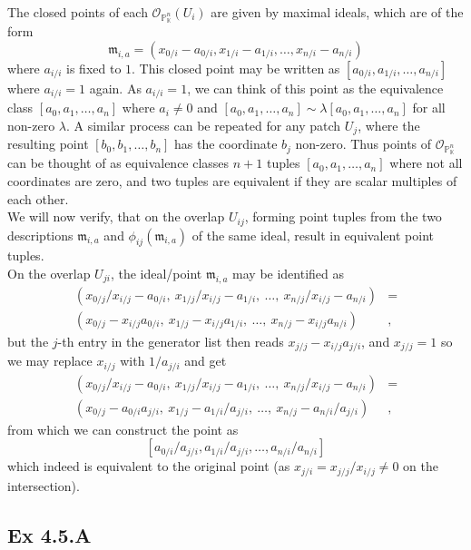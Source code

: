 \documentclass{article}
\theoremstyle{definition}
\newcommand{\K}{\mathbb{K}}
\renewcommand{\P}{\mathbb{P}}
\newcommand{\oo}{\mathcal{O}}
\newcommand{\oop}[2]{\oo_{\P^{#1}_{#2}}}
\begin{document}
The closed points of each $\oop{n}{\K}(U_i)$ are given by maximal ideals, which
are of the form
\[
	\mathfrak{m}_{i, a} = (x_{0/i} - a_{0/i}, x_{1/i} - a_{1/i}, \ldots, x_{n/i} -
	a_{n/i})
\]
where $a_{i/i}$ is fixed to $1$. This closed point may be written as $[a_{0/i},
			a_{1/i}, \ldots, a_{n/i}]$ where $a_{i/i} = 1$ again. As $a_{i/i} = 1$, we can
think of this point as the equivalence class $[a_{0}, a_{1}, \ldots, a_{n}]$
where $a_i \not = 0$ and $[a_{0}, a_{1}, \ldots, a_{n}] \sim \lambda[a_{0},
		a_{1}, \ldots, a_{n}]$ for all non-zero $\lambda$. A similar process can be
repeated for any patch $U_j$, where the resulting point $[b_{0}, b_{1}, \ldots,
			b_{n}]$ has the coordinate $b_j$ non-zero. Thus points of $\oop{n}{\K}$ can be
thought of as equivalence classes $n + 1$ tuples $[a_{0}, a_{1}, \ldots,
			a_{n}]$ where not all coordinates are zero, and two tuples are equivalent if
they are scalar multiples of each other. \\

We will now verify, that on the overlap $U_{ij}$, forming point tuples from the
two descriptions $\mathfrak{m}_{i, a}$ and $\phi_{ij}(\mathfrak{m}_{i, a})$ of
the same ideal, result in equivalent point tuples. \\

On the overlap $U_{ji}$, the ideal/point $\mathfrak{m}_{i, a}$ may be
identified as
\begin{align*}
	(x_{0/j}/x_{i/j} - a_{0/i},\ x_{1/j}/x_{i/j} - a_{1/i},\ \ldots,\ x_{n/j}/x_{i/j} - a_{n/i})
	 & = \\
	(x_{0/j} - x_{i/j}a_{0/i},\ x_{1/j} - x_{i/j}a_{1/i},\ \ldots,\ x_{n/j} - x_{i/j}a_{n/i})
	 & ,
\end{align*}
but the $j$-th entry in the generator list then reads $x_{j/j} - x_{i/j} a_{j/i}$,
and $x_{j/j}=1$ so we may replace $x_{i/j}$ with $1/a_{j/i}$ and get
\begin{align*}
	(x_{0/j}/x_{i/j} - a_{0/i},\ x_{1/j}/x_{i/j} - a_{1/i},\ \ldots,\ x_{n/j}/x_{i/j} - a_{n/i})
	 & = \\
	(x_{0/j} - a_{0/i}a_{j/i},\ x_{1/j} - a_{1/i}/a_{j/i},\ \ldots,\ x_{n/j} - a_{n/i}/a_{j/i})
	 & ,
\end{align*}
from which we can construct the point as
\[
	[a_{0/i}/a_{j/i}, a_{1/i}/a_{j/i}, \ldots, a_{n/i}/a_{n/i}]
\]
which indeed is equivalent to the original point (as $x_{j/i} = x_{j/j}/x_{i/j}
	\not = 0$ on the intersection).

\subsection*{Ex 4.5.A}
\end{document}
